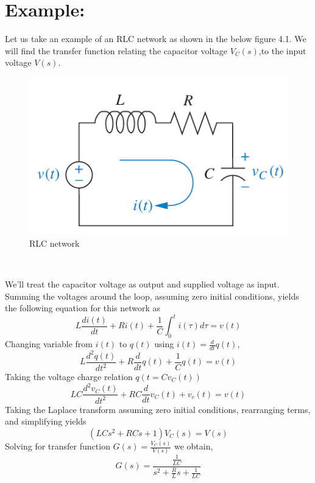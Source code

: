 \documentclass{report}
\begin{document}
\section{Example:}
Let us take an example of an RLC network as shown in the below figure 4.1. We will find the transfer function relating the capacitor voltage $V_C(s)$,to the input voltage $V(s)$.
\begin{figure}[htbp]
    \centering
    \includegraphics[scale=0.5]{images/RLC_Network.png}
    \caption{RLC network}
\end{figure}
\\
\par
We'll treat the capacitor voltage as output and supplied voltage as input. Summing the voltages around the loop, assuming zero initial conditions,
yields the following equation for this network as
\begin{equation}
    L\frac{di(t)}{dt}+Ri(t)+\frac{1}{C}\int_{0}^{t}i(\tau)d\tau=v(t)
\end{equation}
Changing variable from $i(t)$ to $q(t)$ using $i(t)=\frac{d}{dt}q(t)$,
\begin{equation}
    L\frac{d^2q(t)}{dt^2}+R\frac{d}{dt}q(t)+\frac{1}{C}q(t)=v(t)
\end{equation}
Taking the voltage charge relation $q(t=Cv_C(t))$
\begin{equation}
    LC\frac{d^2v_C(t)}{dt^2}+RC\frac{d}{dt}v_C(t)+v_c(t)=v(t)
\end{equation}
Taking the Laplace transform assuming zero initial conditions, rearranging terms, and simplifying yields
\begin{equation}
    (LCs^2+RCs+1)V_C(s)=V(s)
\end{equation}
Solving for transfer function $G(s)=\frac{V_C(s)}{V(s)}$ we obtain,
\begin{equation}
    G(s)=\frac{\frac{1}{LC}}{s^2+\frac{R}{L}s+\frac{1}{LC}}
\end{equation}
\end{document}

